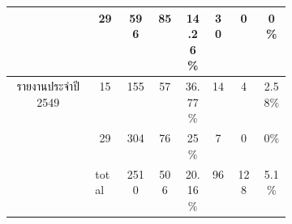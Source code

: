 \begin{table}[H]
\begin{tabular}{|c|c|c|p{0.1\linewidth}|p{0.1\linewidth}|c|p{0.1\linewidth}|p{0.1\linewidth}|}
                                            & 29                         & \multicolumn{1}{c|}{596 }      & \multicolumn{1}{c|}{85 }         & \multicolumn{1}{c|}{14.26\%} & \multicolumn{1}{c|}{30}     & \multicolumn{1}{c|}{0  }             & \multicolumn{1}{c|}{0\%    } \\ \hline
        \multirow{2}{*}{รายงานประจำปี 2549} & 15                           & \multicolumn{1}{c|}{155 }      & \multicolumn{1}{c|}{57 }         & \multicolumn{1}{c|}{36.77\%} & \multicolumn{1}{c|}{14}     & \multicolumn{1}{c|}{4  }             & \multicolumn{1}{c|}{2.58\% } \\ \cline{2-8} 
                                            & 29                         & \multicolumn{1}{c|}{304 }      & \multicolumn{1}{c|}{76 }         & \multicolumn{1}{c|}{25\%   } & \multicolumn{1}{c|}{7 }     & \multicolumn{1}{c|}{0  }             & \multicolumn{1}{c|}{0\%    } \\ \hline
        \multicolumn{1}{|l|}{}              & \multicolumn{1}{l|}{total} & \multicolumn{1}{c|}{2510}      & \multicolumn{1}{c|}{506}         & \multicolumn{1}{c|}{20.16\%} & \multicolumn{1}{c|}{96}     & \multicolumn{1}{c|}{128}             & \multicolumn{1}{c|}{5.1\%  } \\ \hline
        \end{tabular}
        \end{table}


